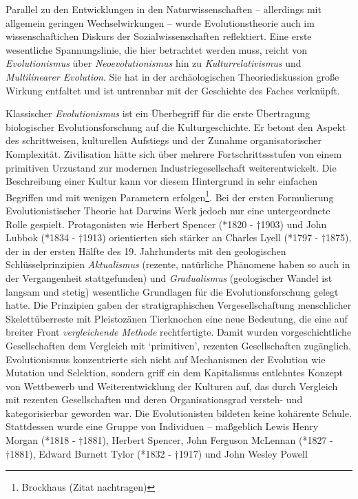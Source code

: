 \documentclass[openany,twoside,twocolumn]{book}
\let\rmarkdownfootnote\footnote%
\def\footnote{\protect\rmarkdownfootnote}
\begin{document}
Parallel zu den Entwicklungen in den Naturwissenschaften -- allerdings
mit allgemein geringen Wechselwirkungen -- wurde Evolutionstheorie auch
im wissenschaftichen Diskurs der Sozialwissenschaften reflektiert. Eine
erste wesentliche Spannungslinie, die hier betrachtet werden muss,
reicht von \emph{Evolutionismus} über \emph{Neoevolutionismus} hin zu
\emph{Kulturrelativismus} und \emph{Multilinearer Evolution}. Sie hat in
der archäologischen Theoriediskussion große Wirkung entfaltet und ist
untrennbar mit der Geschichte des Faches verknüpft.

Klassischer \emph{Evolutionismus} ist ein Überbegriff für die erste
Übertragung biologischer Evolutionsforschung auf die Kulturgeschichte.
Er betont den Aspekt des schrittweisen, kulturellen Aufstiegs und der
Zunahme organisatorischer Komplexität. Zivilisation hätte sich über
mehrere Fortschrittssstufen von einem primitiven Urzustand zur modernen
Industriegesellschaft weiterentwickelt. Die Beschreibung einer Kultur
kann vor diesem Hintergrund in sehr einfachen Begriffen und mit wenigen
Parametern erfolgen\footnote{Brockhaus (Zitat nachtragen)}. Bei der
ersten Formulierung Evolutionistischer Theorie hat Darwins Werk jedoch
nur eine untergeordnete Rolle gespielt. Protagonisten wie Herbert
Spencer (*1820 - †1903) und John Lubbok (*1834 - †1913) orientierten
sich stärker an Charles Lyell (*1797 - †1875), der in der ersten Hälfte
des 19. Jahrhunderts mit den geologischen Schlüsselprinzipien
\emph{Aktualismus} (rezente, natürliche Phänomene haben so auch in der
Vergangenheit stattgefunden) und \emph{Gradualismus} (geologischer
Wandel ist langsam und stetig) wesentliche Grundlagen für die
Evolutionsforschung gelegt hatte. Die Prinzipien gaben der
stratigraphischen Vergesellschaftung menschlicher Skelettüberreste mit
Pleistozänen Tierknochen eine neue Bedeutung, die eine auf breiter Front
\emph{vergleichende Methode} rechtfertigte. Damit wurden
vorgeschichtliche Gesellschaften dem Vergleich mit `primitiven',
rezenten Gesellschaften zugänglich. Evolutionismus konzentrierte sich
nicht auf Mechanismen der Evolution wie Mutation und Selektion, sondern
griff ein dem Kapitalismus entlehntes Konzept von Wettbewerb und
Weiterentwicklung der Kulturen auf, das durch Vergleich mit rezenten
Gesellschaften und deren Organisationsgrad versteh- und kategorisierbar
geworden war. Die Evolutionisten bildeten keine kohärente Schule.
Stattdessen wurde eine Gruppe von Individuen -- maßgeblich Lewis Henry
Morgan (*1818 - †1881), Herbert Spencer, John Ferguson McLennan (*1827 -
†1881), Edward Burnett Tylor (*1832 - †1917) und John Wesley Powell
\end{document}
